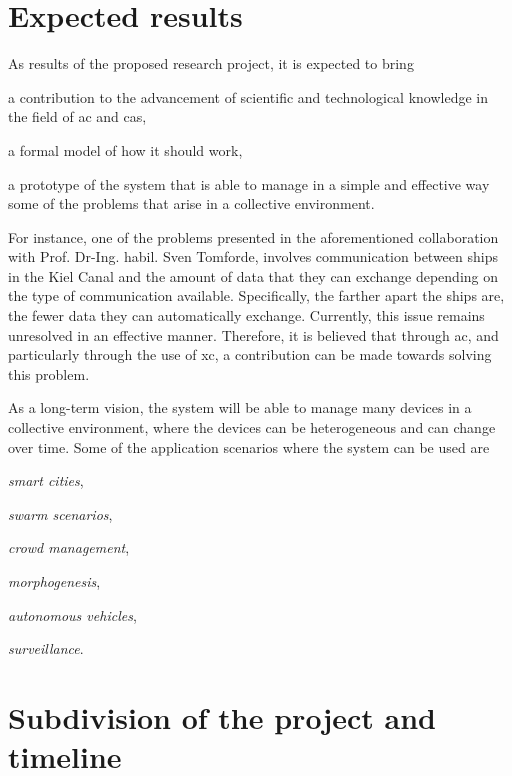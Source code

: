 \documentclass[12pt, a4paper]{article}
\newenvironment{inlinelist}{\begin{enumerate*}[label=\emph{(\roman*)}]}{\end{enumerate*}}
\begin{document}
\section{Expected results}
\label{sec:expected-results}

As results of the proposed research project,
it is expected to bring
\begin{inlinelist}
    \item a contribution to the advancement of scientific and technological knowledge in the field of \ac{ac} and \ac{cas},
    \item a formal model of how it should work,
    \item a prototype of the system that is able to manage in a simple and effective way some of the problems that arise in a collective environment.
\end{inlinelist}
%
For instance,
one of the problems presented in the aforementioned collaboration with Prof. Dr-Ing. habil. Sven Tomforde,
involves communication between ships in the Kiel Canal and the amount of data that they can exchange depending on the
type of communication available.
%
Specifically,
the farther apart the ships are,
the fewer data they can automatically exchange.
%
Currently,
this issue remains unresolved in an effective manner.
%
Therefore,
it is believed that through \ac{ac},
and particularly through the use of \ac{xc},
a contribution can be made towards solving this problem.

As a long-term vision,
the system will be able to manage many devices in a collective environment,
where the devices can be heterogeneous and can change over time.
%
Some of the application scenarios where the system can be used are
\begin{inlinelist}
    \item \emph{smart cities},
    \item \emph{swarm scenarios},
    \item \emph{crowd management},
    \item \emph{morphogenesis},
    \item \emph{autonomous vehicles},
    \item \emph{surveillance}.
\end{inlinelist}

\section{Subdivision of the project and timeline}
\label{sec:subdivision-of-the-project-and-timeline}
\end{document}
